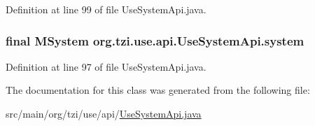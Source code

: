 Definition at line 99 of file Use\-System\-Api.\-java.

\hypertarget{classorg_1_1tzi_1_1use_1_1api_1_1_use_system_api_aabe59f3d91d8ec4b257ec0fce2339a28}{
\subsubsection[{system}]{\setlength{\rightskip}{0pt plus 5cm}final {\bf M\-System} org.\-tzi.\-use.\-api.\-Use\-System\-Api.\-system\hspace{0.3cm}{\ttfamily [protected]}}}\label{classorg_1_1tzi_1_1use_1_1api_1_1_use_system_api_aabe59f3d91d8ec4b257ec0fce2339a28}


Definition at line 97 of file Use\-System\-Api.\-java.



The documentation for this class was generated from the following file\-:\begin{DoxyCompactItemize}
\item 
src/main/org/tzi/use/api/\hyperlink{_use_system_api_8java}{Use\-System\-Api.\-java}\end{DoxyCompactItemize}
